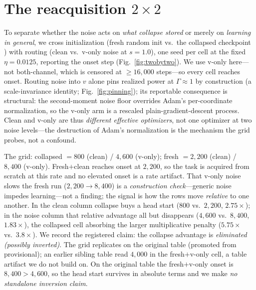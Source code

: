 \documentclass[10pt]{article}
\begin{document}
\section{The reacquisition $2\times2$}
\label{sec:twobytwo}

To separate whether the noise acts on \emph{what collapse stored} or merely on
\emph{learning in general}, we cross initialization (fresh random init vs.\ the
collapsed checkpoint \citep{stochcollapse}) with routing (clean vs.\ v-only noise
at $s{=}1.0$), one seed per cell at the fixed $\eta{=}0.0125$, reporting the onset
step (Fig.~\ref{fig:twobytwo}). We use v-only here---not both-channel, which is
censored at ${\ge}16{,}000$ steps---so every cell reaches onset. Routing noise
into $v$ alone pins realized power at $\Gamma\approx1$ by construction (a
scale-invariance identity; Fig.~\ref{fig:pinning}); its reportable consequence is
structural: the second-moment noise floor overrides Adam's per-coordinate
normalization, so the v-only arm is a rescaled plain-gradient-descent process.
Clean and v-only are thus \emph{different effective optimizers}, not one optimizer
at two noise levels---the destruction of Adam's normalization is the mechanism the
grid probes, not a confound.

The grid: collapsed $=800$ (clean) / $4{,}600$ (v-only); fresh $=2{,}200$ (clean)
/ $8{,}400$ (v-only). Fresh$+$clean reaches onset at $2{,}200$, so the task is
acquired from scratch at this rate and no elevated onset is a rate artifact. That
v-only noise slows the fresh run ($2{,}200\!\to\!8{,}400$) is a \emph{construction
check}---generic noise impedes learning---not a finding; the signal is how the
rows move \emph{relative} to one another. In the clean column collapse buys a
head start ($800$ vs.\ $2{,}200$, $2.75\times$); in the noise column that relative
advantage all but disappears ($4{,}600$ vs.\ $8{,}400$, $1.83\times$), the
collapsed cell absorbing the larger multiplicative penalty ($5.75\times$ vs.\
$3.8\times$). We record the registered claim: the collapse advantage is
\emph{eliminated (possibly inverted)}. The grid replicates on the original table
(promoted from provisional); an earlier sibling table read $4{,}000$ in the
fresh$+$v-only cell, a table artifact we do not build on. On the original table
the fresh$+$v-only onset is $8{,}400>4{,}600$, so the head start survives in
absolute terms and we make \emph{no standalone inversion claim}.
\end{document}
